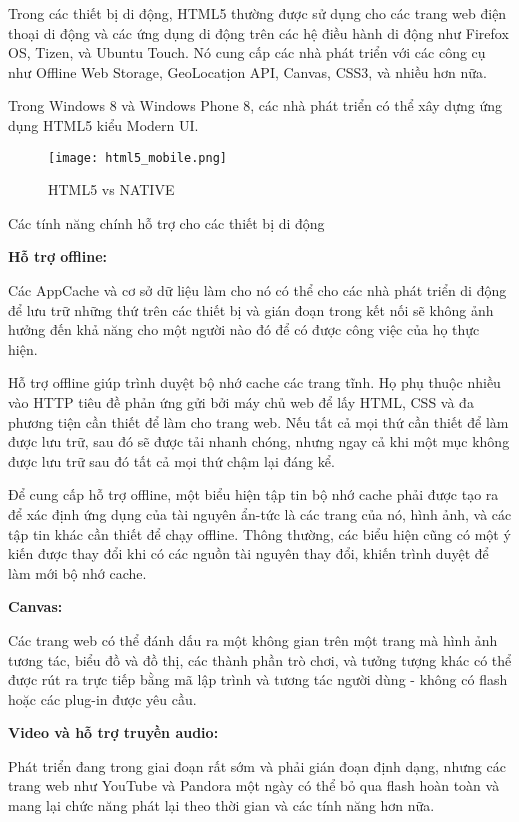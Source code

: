 Trong các thiết bị di động, HTML5 thường được sử dụng cho các trang web điện thoại di động và các ứng dụng di động trên các hệ điều hành di động như Firefox OS, Tizen, và Ubuntu Touch. Nó cung cấp các nhà phát triển với các công cụ như Offline Web Storage, GeoLocatịon API, Canvas, CSS3, và nhiều hơn nữa.

Trong Windows 8 và Windows Phone 8, các nhà phát triển có thể xây dựng ứng dụng HTML5 kiểu Modern UI.

\begin{figure}[!htb] 
\centering
\texttt{[image: html5\_mobile.png]}
\caption{HTML5 vs NATIVE }
\end{figure}

Các tính năng chính hỗ trợ cho các thiết bị di động

\textbf{Hỗ trợ offline:}

Các AppCache và cơ sở dữ liệu làm cho nó có thể cho các nhà phát triển di động để lưu trữ những thứ trên các thiết bị và gián đoạn trong kết nối sẽ không ảnh hưởng đến khả năng cho một người nào đó để có được công việc của họ thực hiện.

Hỗ trợ offline giúp trình duyệt bộ nhớ cache các trang tĩnh. Họ phụ thuộc nhiều vào HTTP tiêu đề phản ứng gửi bởi máy chủ web để lấy HTML, CSS và đa phương tiện cần thiết để làm cho trang web. Nếu tất cả mọi thứ cần thiết để làm được lưu trữ, sau đó sẽ được tải nhanh chóng, nhưng ngay cả khi một mục không được lưu trữ sau đó tất cả mọi thứ chậm lại đáng kể.

Để cung cấp hỗ trợ offline, một biểu hiện tập tin bộ nhớ cache phải được tạo ra để xác định ứng dụng của tài nguyên ẩn-tức là các trang của nó, hình ảnh, và các tập tin khác cần thiết để chạy offline. Thông thường, các biểu hiện cũng có một ý kiến được thay đổi khi có các nguồn tài nguyên thay đổi, khiến trình duyệt để làm mới bộ nhớ cache.

\textbf{Canvas:}

Các trang web có thể đánh dấu ra một không gian trên một trang mà hình ảnh tương tác, biểu đồ và đồ thị, các thành phần trò chơi, và tưởng tượng khác có thể được rút ra trực tiếp bằng mã lập trình và tương tác người dùng - không có flash hoặc các plug-in được yêu cầu.

\textbf{Video và hỗ trợ truyền audio:}

Phát triển đang trong giai đoạn rất sớm và phải gián đoạn định dạng, nhưng các trang web như YouTube và Pandora một ngày có thể bỏ qua flash hoàn toàn và mang lại chức năng phát lại theo thời gian và các tính năng hơn nữa.

